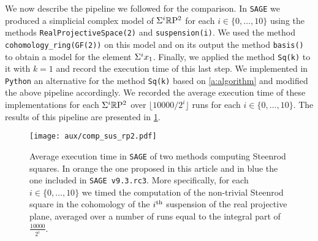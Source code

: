 We now describe the pipeline we followed for the comparison.
In \verb|SAGE| we produced a simplicial complex model of $\Sigma^i \mathbb{R}\mathrm{P}^2$ for each $i \in \{0, \dots, 10\}$ using the methods \verb|RealProjectiveSpace(2)| and \verb|suspension(i)|.
We used the method \verb|cohomology_ring(GF(2))| on this model and on its output the method \verb|basis()| to obtain a model for the element $\Sigma^i x_1$.
Finally, we applied the method \verb|Sq(k)| to it with $k=1$ and record the execution time of this last step.
We implemented in \verb|Python| an alternative for the method \verb|Sq(k)| based on \cref{a:algorithm} and modified the above pipeline accordingly.
We recorded the average execution time of these implementations for each $\Sigma^i \mathbb{R}\mathrm{P}^2$ over $\lfloor 10000/2^i \rfloor$ runs for each $i \in \{0, \dots, 10\}$.
The results of this pipeline are presented in \cref{f:comparison}.

\begin{figure}
	\texttt{[image: aux/comp\_sus\_rp2.pdf]}
	\caption{Average execution time in \texttt{SAGE} of two methods computing Steenrod squares. In orange the one proposed in this article and in blue the one included in \texttt{SAGE v9.3.rc3}. More specifically, for each $i \in \{0, \dots, 10\}$ we timed the computation of the non-trivial Steenrod square in the cohomology of the $i^{\mathrm{th}}$ suspension of the real projective plane, averaged over a number of runs equal to the integral part of $\frac{10000}{2^i}$.}
	\label{f:comparison}
\end{figure}
